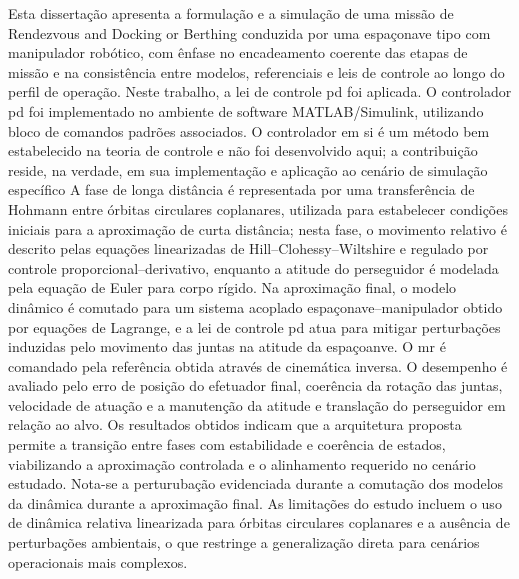 Esta dissertação apresenta a formulação e a simulação de uma missão de Rendezvous and Docking or Berthing conduzida por uma espaçonave tipo com manipulador robótico, com ênfase no encadeamento coerente das etapas de missão e na consistência entre modelos, referenciais e leis de controle ao longo do perfil de operação.
Neste trabalho, a lei de controle \gls{pd} foi aplicada.
O controlador \gls{pd} foi implementado no ambiente de software MATLAB/Simulink, utilizando bloco de comandos  padrões associados. O controlador em si é um método bem estabelecido na teoria de controle e não foi desenvolvido aqui; a contribuição reside, na verdade, em sua implementação e aplicação ao cenário de simulação específico
A fase de longa distância é representada por uma transferência de Hohmann entre órbitas circulares coplanares, utilizada para estabelecer condições iniciais para a aproximação de curta distância; nesta fase, o movimento relativo é descrito pelas equações linearizadas de Hill--Clohessy--Wiltshire e regulado por controle proporcional--derivativo, enquanto a atitude do perseguidor é modelada pela equação de Euler para corpo rígido.
Na aproximação final, o modelo dinâmico é comutado para um sistema acoplado espaçonave--manipulador obtido por equações de Lagrange, e a lei de controle \gls{pd} atua para mitigar perturbações induzidas pelo movimento das juntas na atitude da espaçoanve.
O \gls{mr} é comandado pela referência obtida através de cinemática inversa.
O desempenho é avaliado pelo erro de posição do efetuador final, coerência da rotação das juntas, velocidade de atuação e a manutenção da atitude e translação do perseguidor em relação ao alvo.
Os resultados obtidos indicam que a arquitetura proposta permite a transição entre fases com estabilidade e coerência de estados, viabilizando a aproximação controlada e o alinhamento requerido no cenário estudado.
Nota-se a perturubação evidenciada durante a comutação dos modelos da dinâmica durante a aproximação final.
As limitações do estudo incluem o uso de dinâmica relativa linearizada para órbitas circulares coplanares e a ausência de perturbações ambientais, o que restringe a generalização direta para cenários operacionais mais complexos.
